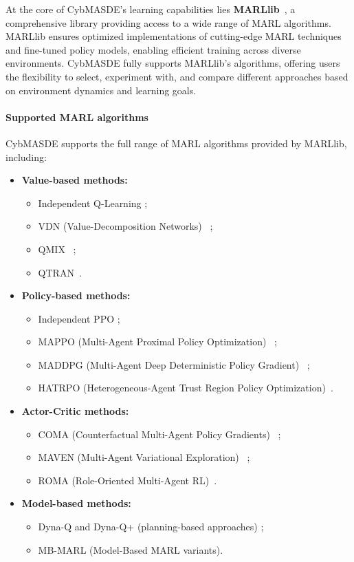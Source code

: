 \documentclass[pdflatex,sn-mathphys-num]{sn-jnl}%
\theoremstyle{thmstyleone}%
\theoremstyle{thmstyletwo}%
\theoremstyle{thmstylethree}%
\begin{document}
At the core of CybMASDE's learning capabilities lies \textbf{MARLlib}~\cite{hu2022marllib}, a comprehensive library providing access to a wide range of MARL algorithms. MARLlib ensures optimized implementations of cutting-edge MARL techniques and fine-tuned policy models, enabling efficient training across diverse environments. CybMASDE fully supports MARLlib's algorithms, offering users the flexibility to select, experiment with, and compare different approaches based on environment dynamics and learning goals.

\paragraph{Supported MARL algorithms}
CybMASDE supports the full range of MARL algorithms provided by MARLlib, including:
\begin{itemize}
    \item \textbf{Value-based methods:}
          \begin{itemize}
              \item Independent Q-Learning ;
              \item VDN (Value-Decomposition Networks)~\cite{sunehag2018vdn} ;
              \item QMIX~\cite{rashid2018qmix} ;
              \item QTRAN~\cite{son2019qtran}.
          \end{itemize}
    \item \textbf{Policy-based methods:}
          \begin{itemize}
              \item Independent PPO ;
              \item MAPPO (Multi-Agent Proximal Policy Optimization)~\cite{yu2021mappo} ;
              \item MADDPG (Multi-Agent Deep Deterministic Policy Gradient)~\cite{lowe2017multi} ;
              \item HATRPO (Heterogeneous-Agent Trust Region Policy Optimization)~\cite{kuba2021trust}.
          \end{itemize}
    \item \textbf{Actor-Critic methods:}
          \begin{itemize}
              \item COMA (Counterfactual Multi-Agent Policy Gradients)~\cite{foerster2018counterfactual} ;
              \item MAVEN (Multi-Agent Variational Exploration)~\cite{mahajan2019maven} ;
              \item ROMA (Role-Oriented Multi-Agent RL)~\cite{wang2020roma}.
          \end{itemize}
    \item \textbf{Model-based methods:}
          \begin{itemize}
              \item Dyna-Q and Dyna-Q+ (planning-based approaches) ;
              \item MB-MARL (Model-Based MARL variants).
          \end{itemize}
\end{itemize}
\end{document}
